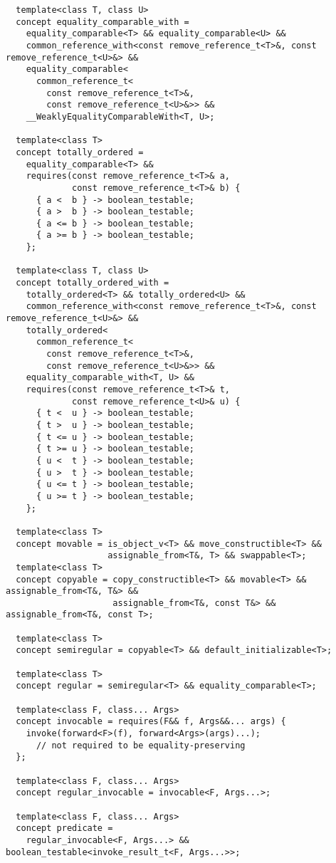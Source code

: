 \begin{verbatim}
  template<class T, class U>
  concept equality_comparable_with =
    equality_comparable<T> && equality_comparable<U> &&
    common_reference_with<const remove_reference_t<T>&, const remove_reference_t<U>&> &&
    equality_comparable<
      common_reference_t<
        const remove_reference_t<T>&,
        const remove_reference_t<U>&>> &&
    __WeaklyEqualityComparableWith<T, U>;

  template<class T>
  concept totally_ordered =
    equality_comparable<T> &&
    requires(const remove_reference_t<T>& a,
             const remove_reference_t<T>& b) {
      { a <  b } -> boolean_testable;
      { a >  b } -> boolean_testable;
      { a <= b } -> boolean_testable;
      { a >= b } -> boolean_testable;
    };

  template<class T, class U>
  concept totally_ordered_with =
    totally_ordered<T> && totally_ordered<U> &&
    common_reference_with<const remove_reference_t<T>&, const remove_reference_t<U>&> &&
    totally_ordered<
      common_reference_t<
        const remove_reference_t<T>&,
        const remove_reference_t<U>&>> &&
    equality_comparable_with<T, U> &&
    requires(const remove_reference_t<T>& t,
             const remove_reference_t<U>& u) {
      { t <  u } -> boolean_testable; 
      { t >  u } -> boolean_testable;
      { t <= u } -> boolean_testable;
      { t >= u } -> boolean_testable;
      { u <  t } -> boolean_testable;
      { u >  t } -> boolean_testable;
      { u <= t } -> boolean_testable;
      { u >= t } -> boolean_testable;
    };

  template<class T>
  concept movable = is_object_v<T> && move_constructible<T> &&
                    assignable_from<T&, T> && swappable<T>;
  template<class T>
  concept copyable = copy_constructible<T> && movable<T> && assignable_from<T&, T&> &&
                     assignable_from<T&, const T&> && assignable_from<T&, const T>;

  template<class T>
  concept semiregular = copyable<T> && default_initializable<T>;

  template<class T>
  concept regular = semiregular<T> && equality_comparable<T>;

  template<class F, class... Args>
  concept invocable = requires(F&& f, Args&&... args) {
    invoke(forward<F>(f), forward<Args>(args)...);
      // not required to be equality-preserving
  };

  template<class F, class... Args>
  concept regular_invocable = invocable<F, Args...>;

  template<class F, class... Args>
  concept predicate =
    regular_invocable<F, Args...> && boolean_testable<invoke_result_t<F, Args...>>;


\end{verbatim}
